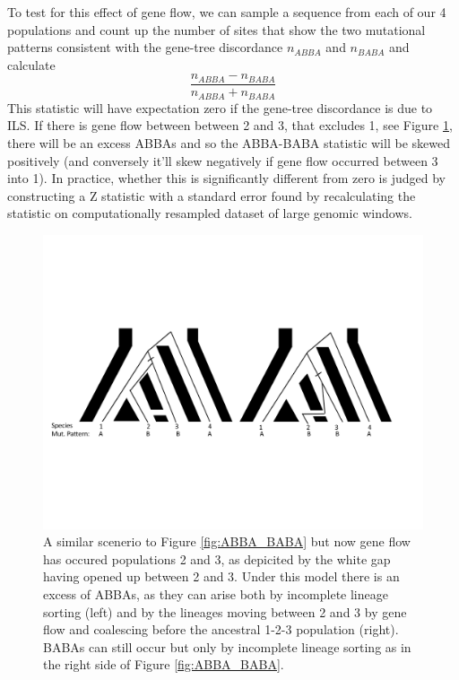 To test for this effect of gene flow, we can sample a sequence from each of our 4 populations and count up the number of sites that show the two mutational patterns consistent with the gene-tree discordance $n_{ABBA}$ and
$n_{BABA}$ and calculate
\begin{equation}
  \frac{n_{ABBA}-n_{BABA}}{n_{ABBA}+n_{BABA}} \label{eqn:ABBA_BABA}
\end{equation}
This statistic will have expectation zero if the gene-tree discordance
is due to ILS. If there is gene flow between between 2 and 3, that
excludes 1, see Figure \ref{fig:ABBA_BABA_introgression}, there will be an excess ABBAs and so the ABBA-BABA
statistic will be skewed positively (and conversely it'll skew negatively if gene
flow occurred between 
3 into 1). In practice, whether this is significantly different from
zero is judged by constructing a  Z statistic with a standard error
found by recalculating the statistic on computationally resampled
dataset of large genomic windows.


\begin{figure}
\begin{center}
\includegraphics[width=\textwidth]{figures/Genetic_drift/ILS/ABBA_BABA_introgression.pdf}
\end{center}
\caption{A similar scenerio to Figure \ref{fig:ABBA_BABA} but now gene
  flow has occured populations 2 and 3, as depicited by the white gap
  having opened up between 2 and 3. Under
  this model there is an excess of ABBAs,  as they can arise both by
  incomplete lineage sorting (left) and by the lineages moving between
  2 and 3 by gene flow and coalescing before the ancestral 1-2-3
  population (right). BABAs can still occur but only by incomplete
  lineage sorting as in the right side of Figure \ref{fig:ABBA_BABA}.} \label{fig:ABBA_BABA_introgression}
\end{figure}



